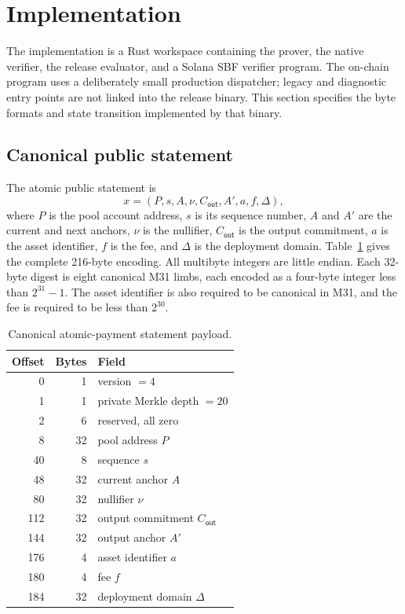 \section{Implementation}
\label{sec:implementation}

The implementation is a Rust workspace containing the prover, the native
verifier, the release evaluator, and a Solana SBF verifier program.  The
on-chain program uses a deliberately small production dispatcher; legacy and
diagnostic entry points are not linked into the release binary.  This section
specifies the byte formats and state transition implemented by that binary.

\subsection{Canonical public statement}
\label{sec:implementation-statement}

The atomic public statement is
\[
  x=(P,s,A,\nu,C_{\mathsf{out}},A',a,f,\Delta),
\]
where \(P\) is the pool account address, \(s\) is its sequence number, \(A\)
and \(A'\) are the current and next anchors, \(\nu\) is the nullifier,
\(C_{\mathsf{out}}\) is the output commitment, \(a\) is the asset identifier,
\(f\) is the fee, and \(\Delta\) is the deployment domain.
Table~\ref{tab:statement-wire} gives the complete 216-byte encoding.  All multibyte integers are little endian.  Each 32-byte
digest is eight canonical M31 limbs, each encoded as a four-byte integer less
than \(2^{31}-1\).  The asset identifier is also required to be canonical in
M31, and the fee is required to be less than \(2^{30}\).

\begin{table}[t]
  \centering
  \small
  \caption{Canonical atomic-payment statement payload.}
  \label{tab:statement-wire}
  \begin{tabular}{r r l}
    \toprule
    Offset & Bytes & Field \\
    \midrule
    0   & 1  & version \(=4\) \\
    1   & 1  & private Merkle depth \(=20\) \\
    2   & 6  & reserved, all zero \\
    8   & 32 & pool address \(P\) \\
    40  & 8  & sequence \(s\) \\
    48  & 32 & current anchor \(A\) \\
    80  & 32 & nullifier \(\nu\) \\
    112 & 32 & output commitment \(C_{\mathsf{out}}\) \\
    144 & 32 & output anchor \(A'\) \\
    176 & 4  & asset identifier \(a\) \\
    180 & 4  & fee \(f\) \\
    184 & 32 & deployment domain \(\Delta\) \\
    \bottomrule
  \end{tabular}
\end{table}

